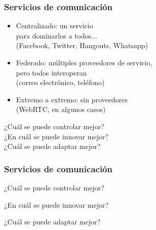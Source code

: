 \documentclass[17pt,aspectratio=169,hyperref=pdfusetitle]{beamer}
\begin{document}

\begin{frame}
\frametitle{Servicios de comunicación}

  \begin{itemize}
  \item Centralizado: un servicio \\
    para dominarlos a todos... \\
    (Facebook, Twitter, Hangouts, Whatsapp)
  \item Federado: múltiples proveedores de servicio, \\
    pero todos interoperan \\
    (correo electrónico, teléfono)
  \item Extremo a extremo: sin proveedores \\
    (WebRTC, en algunos casos)
  \end{itemize}

  \begin{flushright}
¿Cuál se puede controlar mejor? \\

¿En cuál se puede innovar mejor? \\

    ¿Cuál se puede adaptar mejor? \\
    \end{flushright}

\end{frame}


\begin{frame}
\frametitle{Servicios de comunicación}

\begin{flushright}
  {\Large
    ¿Cuál se puede controlar mejor? \\

    \vspace{.5cm}
    
    ¿En cuál se puede innovar mejor? \\

    \vspace{.5cm}

    ¿Cuál se puede adaptar mejor? \\
  }
    \end{flushright}

\end{frame}
\end{document}
